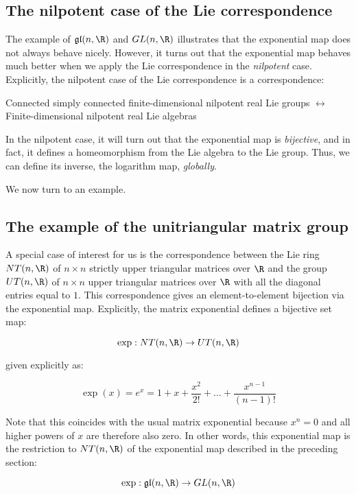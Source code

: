 \documentclass{ucetd}
\begin{document}
\subsection{The nilpotent case of the Lie correspondence}

The example of $\mathfrak{g}\mathfrak{l}(n,\R)$ and $GL(n,\R)$
illustrates that the exponential map does not always behave
nicely. However, it turns out that the exponential map behaves much
better when we apply the Lie correspondence in the {\em nilpotent}
case. Explicitly, the nilpotent case of the Lie correspondence is a
correspondence:

\begin{center}
  Connected simply connected finite-dimensional nilpotent real Lie
  groups $\leftrightarrow$ Finite-dimensional nilpotent real Lie
  algebras
\end{center}

In the nilpotent case, it will turn out that the exponential map is
{\em bijective}, and in fact, it defines a homeomorphism from the Lie
algebra to the Lie group. Thus, we can define its inverse, the
logarithm map, {\em globally}.

We now turn to an example.

\subsection{The example of the unitriangular matrix group}\label{sec:unitriangular-lie-correspondence}

A special case of interest for us is the correspondence between the
Lie ring $NT(n,\R)$ of $n \times n$ strictly upper triangular matrices
over $\R$ and the group $UT(n,\R)$ of $n \times n$ upper triangular
matrices over $\R$ with all the diagonal entries equal to $1$. This
correspondence gives an element-to-element bijection via the
exponential map. Explicitly, the matrix exponential defines a
bijective set map:

$$\exp: NT(n,\R) \to UT(n,\R)$$

given explicitly as:

$$\exp(x) = e^x = 1 + x + \frac{x^2}{2!} + \dots + \frac{x^{n-1}}{(n - 1)!}$$

Note that this coincides with the usual matrix exponential because
$x^n = 0$ and all higher powers of $x$ are therefore also zero. In
other words, this exponential map is the restriction to $NT(n,\R)$ of
the exponential map described in the preceding section:

$$\exp: \mathfrak{g}\mathfrak{l}(n,\R) \to GL(n,\R)$$
\end{document}
